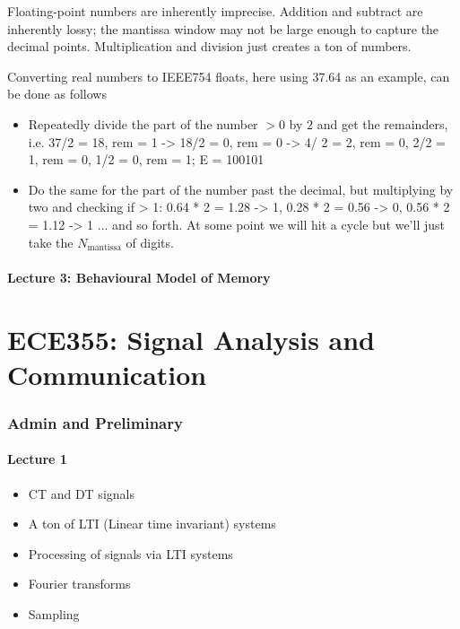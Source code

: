 \documentclass[10pt]{article}
\begin{document}
\begin{definition}
	Floating-point numbers are inherently imprecise. Addition and subtract are inherently lossy; the mantissa window may not be large enough to capture the decimal points. Multiplication and division just creates a ton of numbers.

	Converting real numbers to IEEE754 floats, here using 37.64 as an example, can be done as follows
	\begin{itemize}
		\item Repeatedly divide the part of the number $ >0 $ by $ 2 $ and get the remainders, i.e. 37/2 = 18, rem = 1 -> 18/2 = 0, rem = 0 -> 4/ 2 = 2, rem = 0, 2/2 = 1, rem = 0, 1/2 = 0, rem = 1; E = 100101
		\item Do the same for the part of the number past the decimal, but multiplying by two and checking if > 1: 0.64 * 2 = 1.28 -> 1, 0.28 * 2 = 0.56 -> 0, 0.56 * 2 = 1.12 -> 1 ... and so forth. At some point we will hit a cycle but we'll just take the $ N_{\text{mantissa}} $ of digits.
	\end{itemize}

\end{definition}







\subsection{Lecture 3: Behavioural Model of Memory}


\part{ECE355: Signal Analysis and Communication}


\section{Admin and Preliminary}
\subsection{Lecture 1}
\begin{itemize}
	\item  CT and DT signals
	\item A ton of LTI (Linear time invariant) systems
	\item Processing of signals via LTI systems
	\item Fourier transforms
	\item Sampling
\end{itemize}
\end{document}
